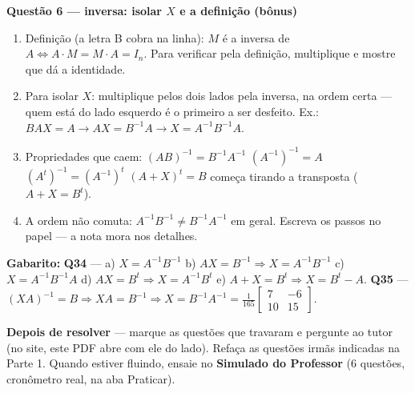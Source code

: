 \documentclass[11pt]{article}
\begin{document}
\begin{metodobox}
\textbf{\color{tealdeep}Questão 6 — inversa: isolar $X$ e a definição (bônus)}
\begin{enumerate}[label=\arabic*., leftmargin=1.6em]
  \item Definição (a letra B cobra na linha): $M$ é a inversa de $A \Leftrightarrow A\cdot M = M\cdot A = I_{n}$. Para verificar pela definição, multiplique e mostre que dá a identidade.
  \item Para isolar $X$: multiplique pelos dois lados pela inversa, na ordem certa — quem está do lado esquerdo é o primeiro a ser desfeito. Ex.: $BAX=A \to AX=B^{-1}A \to X=A^{-1}B^{-1}A$.
  \item Propriedades que caem: $(AB)^{-1}=B^{-1}A^{-1}$ \quad $(A^{-1})^{-1}=A$ \quad $(A^{t})^{-1}=(A^{-1})^{t}$ \quad $(A+X)^{t}=B$ começa tirando a transposta ($A+X=B^{t}$).
  \item A ordem não comuta: $A^{-1}B^{-1}\neq B^{-1}A^{-1}$ em geral. Escreva os passos no papel — a nota mora nos detalhes.
\end{enumerate}
\textbf{Gabarito:} \textbf{Q34} — a) $X=A^{-1}B^{-1}$ \; b) $AX=B^{-1}\Rightarrow X=A^{-1}B^{-1}$ \; c) $X=A^{-1}B^{-1}A$ \; d) $AX=B^{t}\Rightarrow X=A^{-1}B^{t}$ \; e) $A+X=B^{t}\Rightarrow X=B^{t}-A$. \quad \textbf{Q35} — $(XA)^{-1}=B \Rightarrow XA=B^{-1} \Rightarrow X=B^{-1}A^{-1} = \tfrac{1}{165}\begin{bmatrix} 7 & -6 \\ 10 & 15 \end{bmatrix}$.
\end{metodobox}

\vspace{6pt}
\begin{strategiabox}
\textbf{\color{amberdeep}Depois de resolver} — marque as questões que travaram e pergunte ao tutor (no site, este PDF abre com ele do lado). Refaça as questões irmãs indicadas na Parte 1. Quando estiver fluindo, ensaie no \textbf{Simulado do Professor} (6 questões, cronômetro real, na aba Praticar).
\end{strategiabox}
\end{document}
